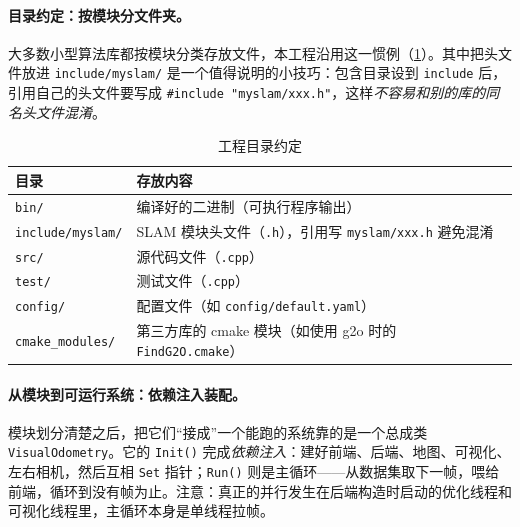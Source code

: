 \paragraph{目录约定：按模块分文件夹。}
大多数小型算法库都按模块分类存放文件，本工程沿用这一惯例（\cref{tab:sys-dirs}）。其中把头文件放进 \texttt{include/myslam/} 是一个值得说明的小技巧：包含目录设到 \texttt{include} 后，引用自己的头文件要写成 \verb|#include "myslam/xxx.h"|，这样\emph{不容易和别的库的同名头文件混淆}。

\begin{table}[H]\centering\small
\caption{工程目录约定}
\label{tab:sys-dirs}
\begin{tabular}{ll}
\toprule
目录 & 存放内容 \\
\midrule
\texttt{bin/} & 编译好的二进制（可执行程序输出） \\
\texttt{include/myslam/} & SLAM 模块头文件（\texttt{.h}），引用写 \texttt{myslam/xxx.h} 避免混淆 \\
\texttt{src/} & 源代码文件（\texttt{.cpp}） \\
\texttt{test/} & 测试文件（\texttt{.cpp}） \\
\texttt{config/} & 配置文件（如 \texttt{config/default.yaml}） \\
\texttt{cmake\_modules/} & 第三方库的 cmake 模块（如使用 g2o 时的 \texttt{FindG2O.cmake}） \\
\bottomrule
\end{tabular}
\end{table}

\paragraph{从模块到可运行系统：依赖注入装配。}
模块划分清楚之后，把它们“接成”一个能跑的系统靠的是一个总成类 \texttt{VisualOdometry}。它的 \texttt{Init()} 完成\emph{依赖注入}：建好前端、后端、地图、可视化、左右相机，然后互相 \texttt{Set} 指针；\texttt{Run()} 则是主循环——从数据集取下一帧，喂给前端，循环到没有帧为止。注意：真正的并行发生在后端构造时启动的优化线程和可视化线程里，主循环本身是单线程拉帧。

